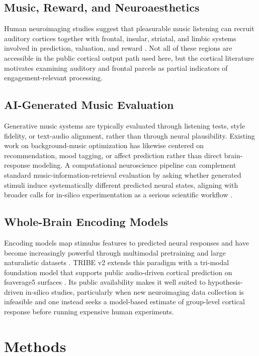 \documentclass[conference]{IEEEtran}
\begin{document}
\subsection{Music, Reward, and Neuroaesthetics}

Human neuroimaging studies suggest that pleasurable music listening can recruit auditory cortices together with frontal, insular, striatal, and limbic systems involved in prediction, valuation, and reward \cite{salimpoor2011,zatorre2013,koelsch2014}. Not all of these regions are accessible in the public cortical output path used here, but the cortical literature motivates examining auditory and frontal parcels as partial indicators of engagement-relevant processing.

\subsection{AI-Generated Music Evaluation}

Generative music systems are typically evaluated through listening tests, style fidelity, or text-audio alignment, rather than through neural plausibility. Existing work on background-music optimization has likewise centered on recommendation, mood tagging, or affect prediction rather than direct brain-response modeling. A computational neuroscience pipeline can complement standard music-information-retrieval evaluation by asking whether generated stimuli induce systematically different predicted neural states, aligning with broader calls for in-silico experimentation as a serious scientific workflow \cite{jain2024}.

\subsection{Whole-Brain Encoding Models}

Encoding models map stimulus features to predicted neural responses and have become increasingly powerful through multimodal pretraining and large naturalistic datasets \cite{nishimoto2011,huth2016}. TRIBE v2 extends this paradigm with a tri-modal foundation model that supports public audio-driven cortical prediction on fsaverage5 surfaces \cite{tribev2}. Its public availability makes it well suited to hypothesis-driven in-silico studies, particularly when new neuroimaging data collection is infeasible and one instead seeks a model-based estimate of group-level cortical response before running expensive human experiments.

\section{Methods}
\label{sec:methods}
\end{document}
